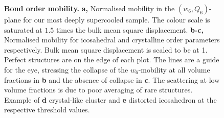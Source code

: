 \begin{figure}
	\caption{\textbf{Bond order mobility.} {\bf a,} Normalised mobility in the $(w_6, Q_6)$-plane for our most deeply supercooled sample. The colour scale is saturated at $1.5$ times the bulk mean square displacement. {\bf b-c,} Normalised mobility for icosahedral and crystalline order parameters respectively. Bulk mean square displacement is scaled to be at 1. Perfect structures are on the edge of each plot. The lines are a guide for the eye, stressing the collapse of the $w_6$-mobility at all volume fractions in {\bf b} and the absence of collapse in {\bf c}. The scattering at low volume fractions is due to poor averaging of rare structures. Example of \textbf{d} crystal-like cluster and \textbf{e} distorted icosahedron at the respective threshold values.}
	\label{fig:msd_Q6_w6}
\end{figure}
\tikzset{external/force remake=false}

